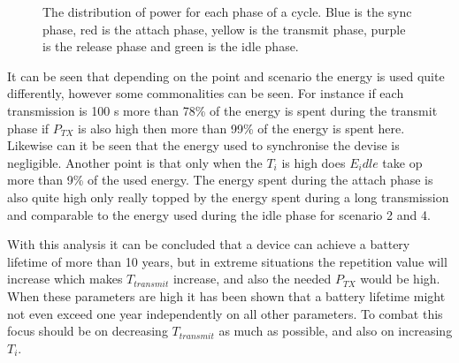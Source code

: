 \begin{figure}[H]
\begin{minipage}{0.48\textwidth}
\begin{table}[H]
\centering
{}
\end{table}

\end{minipage}
\caption{The distribution of power for each phase of a cycle. Blue is the sync phase, red is the attach phase, yellow is the transmit phase, purple is the release phase and green is the idle phase.}
\label{fig:barplot_plots}
\end{figure}

It can be seen that depending on the point and scenario the energy is used quite differently, however some commonalities can be seen. For instance if each transmission is 100 s more than 78\% of the energy is spent during the transmit phase if $P_{TX}$ is also high then more than 99\% of the energy is spent here. Likewise can it be seen that the energy used to synchronise the devise is negligible. Another point is that  only when the $T_i$ is high does $E_idle$ take op more than 9\% of the used energy. The energy spent during the attach phase is also quite high only really topped by the energy spent during a long transmission and comparable to the energy used during the idle phase for scenario 2 and 4. 

With this analysis it can be concluded that a device can achieve a battery lifetime of more than 10 years, but in extreme situations the repetition value will increase which makes $T_{transmit}$ increase, and also the needed $P_{TX}$ would be high. When these parameters are high it has been shown that a battery lifetime might not even exceed one year independently on all other parameters. To combat this focus should be on decreasing $T_{transmit}$ as much as possible, and also on increasing $T_i$. 
